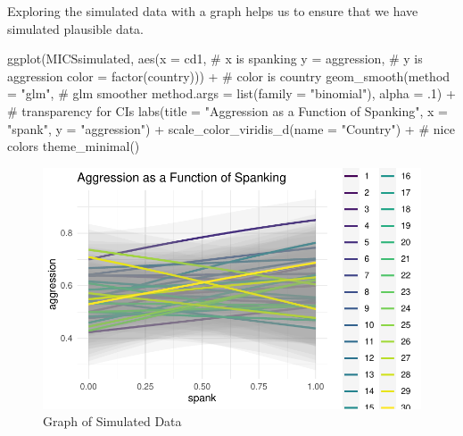 \documentclass[
  letterpaper,
  DIV=11,
  numbers=noendperiod]{scrreprt}
\newenvironment{Shaded}{\begin{snugshade}}{\end{snugshade}}
\newcommand{\AttributeTok}[1]{\textcolor[rgb]{0.40,0.45,0.13}{#1}}
\newcommand{\CommentTok}[1]{\textcolor[rgb]{0.37,0.37,0.37}{#1}}
\newcommand{\DecValTok}[1]{\textcolor[rgb]{0.68,0.00,0.00}{#1}}
\newcommand{\FunctionTok}[1]{\textcolor[rgb]{0.28,0.35,0.67}{#1}}
\newcommand{\NormalTok}[1]{\textcolor[rgb]{0.00,0.23,0.31}{#1}}
\newcommand{\SpecialCharTok}[1]{\textcolor[rgb]{0.37,0.37,0.37}{#1}}
\newcommand{\StringTok}[1]{\textcolor[rgb]{0.13,0.47,0.30}{#1}}
\begin{document}
Exploring the simulated data with a graph helps us to ensure that we
have simulated plausible data.

\begin{Shaded}
\begin{Highlighting}[]
\FunctionTok{ggplot}\NormalTok{(MICSsimulated,}
       \FunctionTok{aes}\NormalTok{(}\AttributeTok{x =}\NormalTok{ cd1, }\CommentTok{\# x is spanking}
           \AttributeTok{y =}\NormalTok{ aggression, }\CommentTok{\# y is aggression}
           \AttributeTok{color =} \FunctionTok{factor}\NormalTok{(country))) }\SpecialCharTok{+} \CommentTok{\# color is country}
  \FunctionTok{geom\_smooth}\NormalTok{(}\AttributeTok{method =} \StringTok{"glm"}\NormalTok{, }\CommentTok{\# glm smoother}
              \AttributeTok{method.args =} \FunctionTok{list}\NormalTok{(}\AttributeTok{family =} \StringTok{"binomial"}\NormalTok{),}
              \AttributeTok{alpha =}\NormalTok{ .}\DecValTok{1}\NormalTok{) }\SpecialCharTok{+} \CommentTok{\# transparency for CI\textquotesingle{}s}
  \FunctionTok{labs}\NormalTok{(}\AttributeTok{title =} \StringTok{"Aggression as a Function of Spanking"}\NormalTok{,}
       \AttributeTok{x =} \StringTok{"spank"}\NormalTok{,}
       \AttributeTok{y =} \StringTok{"aggression"}\NormalTok{) }\SpecialCharTok{+}
  \FunctionTok{scale\_color\_viridis\_d}\NormalTok{(}\AttributeTok{name =} \StringTok{"Country"}\NormalTok{) }\SpecialCharTok{+} \CommentTok{\# nice colors}
  \FunctionTok{theme\_minimal}\NormalTok{()}
\end{Highlighting}
\end{Shaded}

\begin{figure}[H]

{\centering \includegraphics{simulate-data_files/figure-pdf/fig-p1-1.pdf}

}

\caption{\label{fig-p1}Graph of Simulated Data}

\end{figure}
\end{document}
